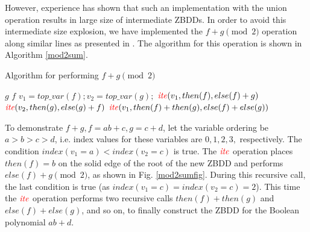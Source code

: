 However, experience has shown that such an implementation with the
union operation results in large size of intermediate ZBDDs. In order
to avoid this intermediate size explosion, we have implemented the
$f+g\pmod 2$ operation along similar lines as presented in
\cite{polybori:2009}. The algorithm for this operation is shown in
Algorithm \ref{mod2sum}.  

\begin{algorithm}
\caption{Algorithm for performing $f+g\pmod 2$}
\label{mod2sum}
\begin{algorithmic}[1]
{\small
{}
\State \Return $g$
\State \Return $f$
\State {}
\Else
\State $v_1 = top\_var(f); v_2 = top\_var(g);$
\State \Return $\textcolor{red}{\mathit{ite}}(v_1,then(f),else(f)+g)$
\State \Return $\textcolor{red}{\mathit{ite}}(v_2,then(g),else(g)+f)$
\Else
\State \Return $\textcolor{red}{\mathit{ite}}(v_1,then(f) + then(g),else(f)+else(g))$
\EndIf


\EndIf
\EndProcedure
}
\end{algorithmic}
\end{algorithm}


\begin{Example}
To demonstrate $f+g, f = ab+c, g = c+d$, let the variable ordering be
$a>b>c>d$, i.e. index values for these variables are $0,1,2,3,$
respectively. The condition $index(v_1=a) < index(v_2=c)$ is true. The 
$\textcolor{red}{\mathit{ite}}$ operation places $then(f) = b$ on the solid edge of the root of
the new ZBDD and performs $else(f) + g \pmod2$, as shown in 
Fig. \ref{mod2sumfig}. During this recursive call, the last condition
is true  (as $index(v_1=c) = index(v_2=c) = 2$). This time the  $\textcolor{red}{\mathit{ite}}$
operation performs two recursive calls $then(f) + then(g)$ and
$else(f) + else(g)$, and so on, to finally construct the ZBDD for the
Boolean polynomial $ab+d$.

 
\end{Example}

